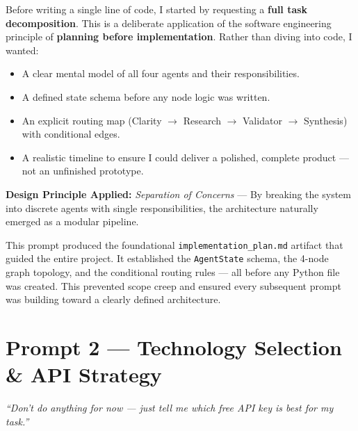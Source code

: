 \documentclass[12pt, a4paper]{article}
\begin{document}
\begin{reasonbox}
Before writing a single line of code, I started by requesting a \textbf{full task decomposition}. This is a deliberate application of the software engineering principle of \textbf{planning before implementation}. Rather than diving into code, I wanted:

\begin{itemize}[leftmargin=1.5em]
    \item A clear mental model of all four agents and their responsibilities.
    \item A defined state schema before any node logic was written.
    \item An explicit routing map (Clarity $\to$ Research $\to$ Validator $\to$ Synthesis) with conditional edges.
    \item A realistic timeline to ensure I could deliver a polished, complete product — not an unfinished prototype.
\end{itemize}

\textbf{Design Principle Applied:} \textit{Separation of Concerns} — By breaking the system into discrete agents with single responsibilities, the architecture naturally emerged as a modular pipeline.
\end{reasonbox}

\begin{impactbox}
This prompt produced the foundational \texttt{implementation\_plan.md} artifact that guided the entire project. It established the \texttt{AgentState} schema, the 4-node graph topology, and the conditional routing rules — all before any Python file was created. This prevented scope creep and ensured every subsequent prompt was building toward a clearly defined architecture.
\end{impactbox}

\section{Prompt 2 — Technology Selection \& API Strategy}

\begin{promptbox}
\textit{``Don't do anything for now — just tell me which free API key is best for my task.''}
\end{promptbox}
\end{document}
